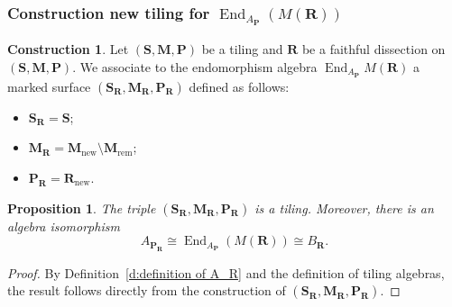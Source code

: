\documentclass[a4paper,10pt]{amsart}
\theoremstyle{plain}          %
\newtheorem{proposition}[theorem]{Proposition}
\theoremstyle{definition}
\newtheorem{construction}[theorem]{Construction}
\def\SS{\mathbf{S}}
\def\RR{\mathbf{R}}
\def\MM{\mathbf{M}}
\def\PP{\mathbf{P}}
\def\MM{\mathbf{M}}
\newcommand{\End}{\operatorname{End}\nolimits}
\begin{document}

 
\subsubsection{Construction new tiling for  $\End_{A_\PP}(M(\mathbf{R}))$}
\begin{construction}
Let $(\SS,\MM,\PP)$ be a tiling and $\mathbf{R}$ be a faithful dissection on $(\SS,\MM,\PP)$. 
We associate to the endomorphism algebra $\End_{A_\PP} M(\mathbf{R})$ a marked surface $(\SS_{\mathbf{R}},\MM_{\mathbf{R}},\PP_{\mathbf{R}})$ defined as follows:
\begin{itemize}
    \item $\SS_{\mathbf{R}} = \SS$;
    \item $\MM_{\mathbf{R}} = \MM_{\text{new}} \setminus \MM_{\text{rem}}$;
    \item $\PP_{\mathbf{R}} = \mathbf{R}_{\text{new}}$.
\end{itemize}
\end{construction}

\begin{proposition}\label{p:A_R isomorphic to End}
The triple $(\SS_{\mathbf{R}},\MM_{\mathbf{R}},\PP_{\mathbf{R}})$ is a tiling. Moreover, there is an algebra isomorphism
\[
A_{\PP_{\mathbf{R}}} \cong \End_{A_\PP}(M(\mathbf{R}))\cong B_{\RR}.
\]
\end{proposition}

\begin{proof}
By Definition~\ref{d:definition of A_R} and the definition of tiling algebras, the result follows directly from the construction of $(\SS_{\mathbf{R}},\MM_{\mathbf{R}},\PP_{\mathbf{R}})$.
\end{proof}
\end{document}
